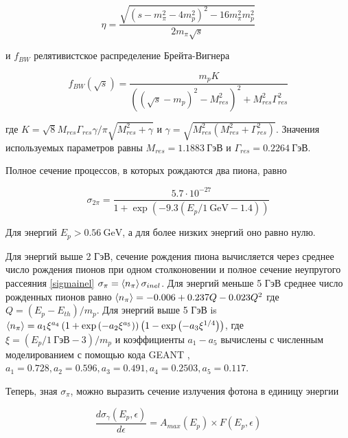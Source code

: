 \begin{equation}
	\eta = \frac{\sqrt{\left(s-m_{\pi}^2-4m_p^2\right)^2-16 m_{\pi}^2m_p^2}}{2m_{\pi}\sqrt{s}}
\end{equation}

и $f_{BW}$ релятивистское распределение Брейта-Вигнера

\begin{equation}
	f_{BW}\left(\sqrt{s}\right)=\frac{m_p K}{\left(\left(\sqrt{s}-m_p\right)^2-M_{res}^2\right)^2+M_{res}^2\Gamma_{res}^2}
\end{equation}

где $K = \sqrt{8}M_{res}\Gamma_{res}\gamma/\pi\sqrt{M_{res}^2+\gamma}$ и $\gamma = \sqrt{M_{res}^2\left(M_{res}^2+\Gamma_{res}^2\right)}$. Значения используемых параметров равны $M_{res} = 1.1883~\text{ГэВ}$ и $\Gamma_{res} = 0.2264~\text{ГэВ}$.

Полное сечение процессов, в которых рождаются два пиона, равно

\begin{equation}
	\sigma_{2\pi}=\frac{5.7\cdot10^{-27}}{1+\exp(-9.3\left(E_p/1~\text{GeV} - 1.4\right))}
\end{equation}

Для энергий $E_p > 0.56~\text{GeV}$, а для более низких энергий оно равно нулю.

Для энергий выше 2 ГэВ, сечение рождения пиона вычисляется через среднее число рождения пионов при одном столконовении и полное сечение неупругого рассеяния \ref{sigmainel} $\sigma_{\pi} = \braket{n_{\pi}} \sigma_{inel}$. Для энергий меньше 5 ГэВ среднее число рожденных пионов равно $\braket{n_{\pi}} = -0.006 + 0.237 Q - 0.023 Q^2$ где $Q = \left(E_p - E_{th}\right)/m_p$. Для энергий выше 5 ГэВ is $\braket{n_{\pi}} = a_1 \xi^{a_4}\left(1 + \exp\left(-a_2\xi^{a_5}\right)\right)\left(1-\exp\left(-a_3\xi^{1/4}\right)\right)$, где $\xi = \left(E_p/1~\text{ГэВ} - 3\right)/m_p$ и коэффициенты $a_1-a_5$ вычислены с численным моделированием с помощью кода GEANT \cite{AllisonGeant2006}, $a_1 = 0.728, a_2 = 0.596, a_3 = 0.491, a_4 = 0.2503, a_5 = 0.117$.

Теперь, зная $\sigma_{\pi}$, можно выразить сечение излучения фотона в единицу энергии

\begin{equation}
	\frac{d\sigma_{\gamma}\left(E_p, \epsilon\right)}{d\epsilon} = A_{max}\left(E_p\right)\times F\left(E_p, \epsilon\right)
\end{equation}

